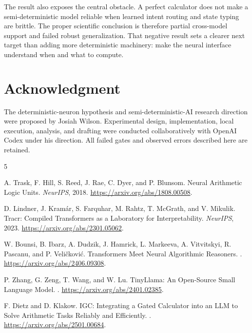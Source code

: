 \documentclass[11pt]{article}
\begin{document}
The result also exposes the central obstacle. A perfect calculator does not
make a semi-deterministic model reliable when learned intent routing and state
typing are brittle. The proper scientific conclusion is therefore partial
cross-model support and failed robust generalization. That negative result
sets a clearer next target than adding more deterministic machinery: make the
neural interface understand when and what to compute.

\section*{Acknowledgment}

The deterministic-neuron hypothesis and semi-deterministic-AI research
direction were proposed by Josiah Wilson. Experimental design, implementation,
local execution, analysis, and drafting were conducted collaboratively with
OpenAI Codex under his direction. All failed gates and observed errors
described here are retained.

\begin{thebibliography}{5}

A. Trask, F. Hill, S. Reed, J. Rae, C. Dyer, and P. Blunsom.
\newblock Neural Arithmetic Logic Units.
\newblock \emph{NeurIPS}, 2018.
\newblock \url{https://arxiv.org/abs/1808.00508}.

D. Lindner, J. Kram\'{a}r, S. Farquhar, M. Rahtz, T. McGrath, and V. Mikulik.
\newblock Tracr: Compiled Transformers as a Laboratory for Interpretability.
\newblock \emph{NeurIPS}, 2023.
\newblock \url{https://arxiv.org/abs/2301.05062}.

W. Bounsi, B. Ibarz, A. Dudzik, J. Hamrick, L. Markeeva, A. Vitvitskyi,
R. Pascanu, and P. Veli\v{c}kovi\'{c}.
\newblock Transformers Meet Neural Algorithmic Reasoners.
.
\newblock \url{https://arxiv.org/abs/2406.09308}.

P. Zhang, G. Zeng, T. Wang, and W. Lu.
\newblock TinyLlama: An Open-Source Small Language Model.
.
\newblock \url{https://arxiv.org/abs/2401.02385}.

F. Dietz and D. Klakow.
\newblock IGC: Integrating a Gated Calculator into an LLM to Solve Arithmetic
Tasks Reliably and Efficiently.
.
\newblock \url{https://arxiv.org/abs/2501.00684}.

\end{thebibliography}
\end{document}
